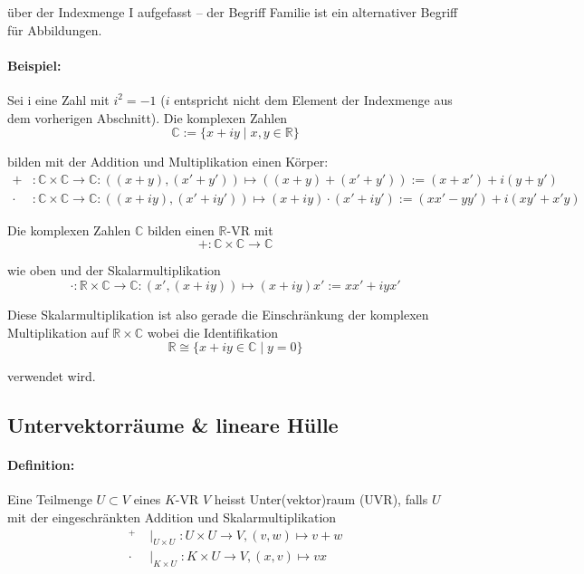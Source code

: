 	über der Indexmenge I aufgefasst -- der Begriff Familie ist ein \glqq alternativer\grqq{} Begriff für Abbildungen.
	
\paragraph{Beispiel:}
	Sei i eine \glqq Zahl\grqq{} mit $i^2=-1$ ($i$ entspricht nicht dem Element der Indexmenge aus dem vorherigen Abschnitt). Die komplexen Zahlen
	\begin{equation*}
		\mathbb{C}:=\{{x+iy\mid x,y\in \mathbb{R}}\}
	\end{equation*}
 
	bilden mit der Addition und Multiplikation einen Körper:
	\begin{align*}
		+&:\mathbb{C}\times \mathbb{C} \to \mathbb{C}: ((x+y),(x'+y')) \mapsto ((x+y)+(x'+y')) := (x+x')+i(y+y')\\
		\cdot &:\mathbb{C}\times \mathbb{C} \to \mathbb{C}: ((x+iy),(x'+iy'))\mapsto (x+iy)\cdot (x'+iy') :=(xx'-yy')+i(xy'+x'y)
	\end{align*}

	Die komplexen Zahlen $\mathbb{C}$ bilden einen $\mathbb{R}$-VR mit
	\begin{equation*}
		+:\mathbb{C}\times\mathbb{C}\to\mathbb{C}
	\end{equation*}

	wie oben und der Skalarmultiplikation
	\begin{equation*}
		\cdot:\mathbb{R}\times\mathbb{C}\to\mathbb{C}:(x',(x+iy))\mapsto(x+iy)x':=xx'+iyx'
	\end{equation*}

	Diese Skalarmultiplikation ist also gerade die Einschränkung der komplexen Multiplikation auf $\mathbb{R}\times\mathbb{C}$ wobei die Identifikation
	\begin{equation*}
		\mathbb{R}\cong \{{x+iy\in\mathbb{C}\mid y=0}\}
	\end{equation*}

	verwendet wird.
\subsection{Untervektorräume \& lineare Hülle}
\paragraph{Definition:}
	Eine Teilmenge $U\subset V$ eines $K$-VR $V$ heisst Unter(vektor)raum (UVR), falls $U$ mit der eingeschränkten Addition und Skalarmultiplikation
	\begin{align*}
		 ^+    & \mid_{U\times U}: U\times U \to V,(v,w) \mapsto v+w \\
		 \cdot & \mid_{K\times U}: K\times U \to V,(x,v) \mapsto vx
	\end{align*}

